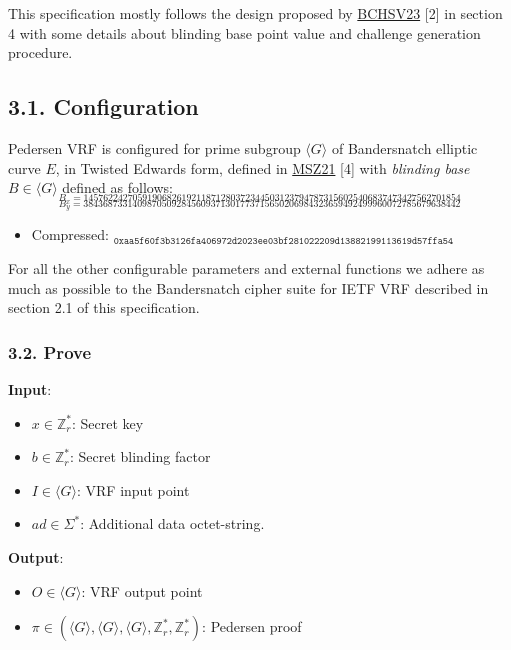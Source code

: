 \documentclass[
]{article}
\providecommand{\tightlist}{%
  \setlength{\itemsep}{0pt}\setlength{\parskip}{0pt}}
\begin{document}
This specification mostly follows the design proposed by
\href{https://eprint.iacr.org/2023/002}{BCHSV23} {[}2{]} in section 4
with some details about blinding base point value and challenge
generation procedure.

\hypertarget{configuration-1}{%
\subsection{3.1. Configuration}\label{configuration-1}}

Pedersen VRF is configured for prime subgroup \(\langle G \rangle\) of
Bandersnatch elliptic curve \(E\), in Twisted Edwards form, defined in
\href{https://eprint.iacr.org/2021/1152}{MSZ21} {[}4{]} with
\emph{blinding base} \(B \in \langle G \rangle\) defined as follows:
\[_{B_x = 14576224270591906826192118712803723445031237947873156025406837473427562701854}\]
\[_{B_y = 38436873314098705092845609371301773715650206984323659492499960072785679638442}\]

\begin{itemize}
\tightlist
\item
  Compressed:
  \(_{\texttt{0xaa5f60f3b3126fa406972d2023ee03bf281022209d13882199113619d57ffa54}}\)
\end{itemize}

For all the other configurable parameters and external functions we
adhere as much as possible to the Bandersnatch cipher suite for IETF VRF
described in section 2.1 of this specification.

\hypertarget{prove-1}{%
\subsubsection{3.2. Prove}\label{prove-1}}

\textbf{Input}:

\begin{itemize}
\tightlist
\item
  \(x \in \mathbb{Z}^*_r\): Secret key
\item
  \(b \in \mathbb{Z}^*_r\): Secret blinding factor
\item
  \(I \in \langle G \rangle\): VRF input point
\item
  \(ad \in \Sigma^*\): Additional data octet-string.
\end{itemize}

\textbf{Output}:

\begin{itemize}
\tightlist
\item
  \(O \in \langle G \rangle\): VRF output point
\item
  \(\pi \in (\langle G \rangle, \langle G \rangle, \langle G \rangle, \mathbb{Z}^*_r, \mathbb{Z}^*_r)\):
  Pedersen proof
\end{itemize}
\end{document}

